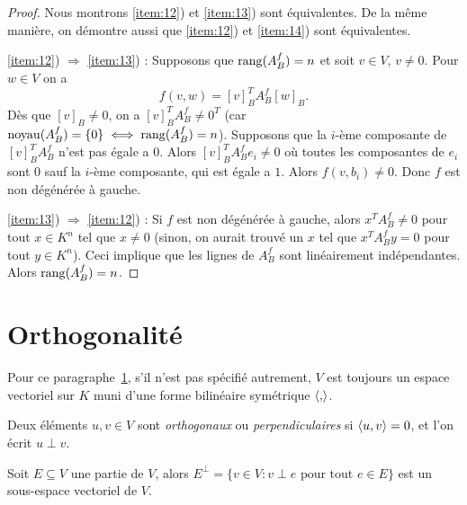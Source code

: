 \begin{proof} 

Nous montrons \ref{item:12}) et \ref{item:13}) sont équivalentes.  De la même manière, on démontre aussi que \ref{item:12}) et \ref{item:14}) sont équivalentes.

\ref{item:12}) $\Rightarrow$ \ref{item:13}) : Supposons que $\operatorname{rang}(A_B^f) = n$ et soit $v \in V$, $v \neq 0$. Pour $w \in V$ on a 
\begin{displaymath}
  f(v,w) = [v]_B^T A_B^f [w]_B. 
\end{displaymath}
Dès que $[v]_B \neq 0$, on a $[v]_B^T A_B^f \neq 0^T$ (car $\operatorname{noyau}(A_B^f) = \{0\} \iff \operatorname{rang}(A_B^f) = n$). Supposons que la $i$-ème composante de $[v]_B^T A_B^f$ n'est pas égale a $0$. Alors $[v]_B^T A_B^f e_i \neq 0$ où toutes les composantes de $e_i$ sont $0$ sauf la $i$-ème composante, 
qui est égale a $1$. Alors $f(v,b_i) \neq 0$. Donc $f$ est non dégénérée à gauche. \newline

\ref{item:13}) $\Rightarrow$ \ref{item:12}) : Si $f$ est non dégénérée à gauche, alors $x^T A_B^f \neq 0$ pour tout $x \in K^n$ tel que $x \neq 0$ (sinon, on aurait trouvé un $x$ tel que $x^T A_B^f y = 0$ pour tout $y \in K^n$). Ceci implique que les lignes de $A_B^f$ sont linéairement indépendantes. Alors $\operatorname{rang}(A_B^f) = n$. 
\end{proof}






\section{Orthogonalité} 
\label{sec:orthogonalite}

\begin{framed}\noindent 
  Pour ce paragraphe~\ref{sec:orthogonalite}, s'il n'est pas spécifié autrement,  $V$
  est toujours un espace vectoriel sur $K$
  muni d'une forme bilinéaire symétrique $\langle {,} \rangle$. 
\end{framed}



\begin{definition}
  \label{def:2}
 Deux éléments $u,v \in V$ sont \emph{orthogonaux} ou \emph{perpendiculaires} si $\langle {u,v} \rangle = 0$, et l'on écrit $u \perp v$. 
\end{definition}

\begin{proposition}
  \label{prop:1}
  Soit $E \subseteq V$ une partie de $V$, alors $E^\perp = \{ v \in V \colon v \perp e \text{ pour tout } e \in E \}$   est un sous-espace vectoriel de $V$. 
\end{proposition}

